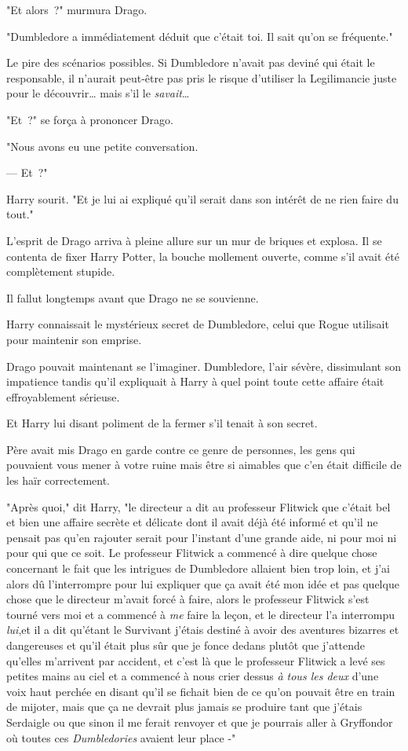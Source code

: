 "Et alors~?" murmura Drago.

"Dumbledore a immédiatement déduit que c'était toi. Il sait qu'on se fréquente."

Le pire des scénarios possibles. Si Dumbledore n'avait pas deviné qui était le responsable, il n'aurait peut-être pas pris le risque d'utiliser la Legilimancie juste pour le découvrir… mais s'il le \emph{savait}…

"Et~?" se força à prononcer Drago.

"Nous avons eu une petite conversation.

--- Et~?"

Harry sourit. "Et je lui ai expliqué qu'il serait dans son intérêt de ne rien faire du tout."

L'esprit de Drago arriva à pleine allure sur un mur de briques et explosa. Il se contenta de fixer Harry Potter, la bouche mollement ouverte, comme s'il avait été complètement stupide.

Il fallut longtemps avant que Drago ne se souvienne.

Harry connaissait le mystérieux secret de Dumbledore, celui que Rogue utilisait pour maintenir son emprise.

Drago pouvait maintenant se l'imaginer. Dumbledore, l'air sévère, dissimulant son impatience tandis qu'il expliquait à Harry à quel point toute cette affaire était effroyablement sérieuse.

Et Harry lui disant poliment de la fermer s'il tenait à son secret.

Père avait mis Drago en garde contre ce genre de personnes, les gens qui pouvaient vous mener à votre ruine mais être si aimables que c'en était difficile de les haïr correctement.

"Après quoi," dit Harry, "le directeur a dit au professeur Flitwick que c'était bel et bien une affaire secrète et délicate dont il avait déjà été informé et qu'il ne pensait pas qu'en rajouter serait pour l'instant d'une grande aide, ni pour moi ni pour qui que ce soit. Le professeur Flitwick a commencé à dire quelque chose concernant le fait que les intrigues de Dumbledore allaient bien trop loin, et j'ai alors dû l'interrompre pour lui expliquer que ça avait été mon idée et pas quelque chose que le directeur m'avait forcé à faire, alors le professeur Flitwick s'est tourné vers moi et a commencé à \emph{me} faire la leçon, et le directeur l'a interrompu \emph{lui},et il a dit qu'étant le Survivant j'étais destiné à avoir des aventures bizarres et dangereuses et qu'il était plus sûr que je fonce dedans plutôt que j'attende qu'elles m'arrivent par accident, et c'est là que le professeur Flitwick a levé ses petites mains au ciel et a commencé à nous crier dessus \emph{à tous les deux} d'une voix haut perchée en disant qu'il se fichait bien de ce qu'on pouvait être en train de mijoter, mais que ça ne devrait plus jamais se produire tant que j'étais Serdaigle ou que sinon il me ferait renvoyer et que je pourrais aller à Gryffondor où toutes ces \emph{Dumbledories} avaient leur place -"

